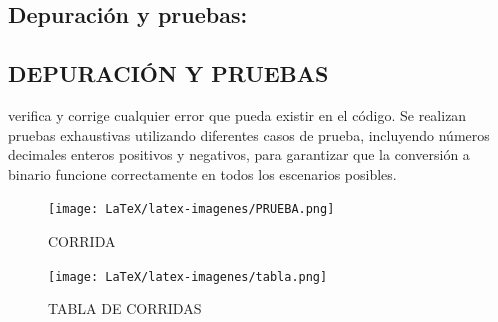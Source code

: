 \subsection{\textbf{Depuración y pruebas:}}

\subsection{\textbf{DEPURACIÓN Y PRUEBAS} }
 verifica y corrige cualquier error que pueda existir en el código. Se realizan pruebas exhaustivas utilizando diferentes casos de prueba, incluyendo números decimales enteros positivos y negativos, para garantizar que la conversión a binario funcione correctamente en todos los escenarios posibles.

 \begin{figure}[h!]
    \centering
    \texttt{[image: LaTeX/latex-imagenes/PRUEBA.png]}
    \caption{ CORRIDA}
    \label{codigo de java }
\end{figure}

\begin{figure}[h!]
    \centering
    \texttt{[image: LaTeX/latex-imagenes/tabla.png]}
    \caption{ TABLA DE CORRIDAS }
    \label{codigo de java }
\end{figure}
\vspace*{-8pt}
